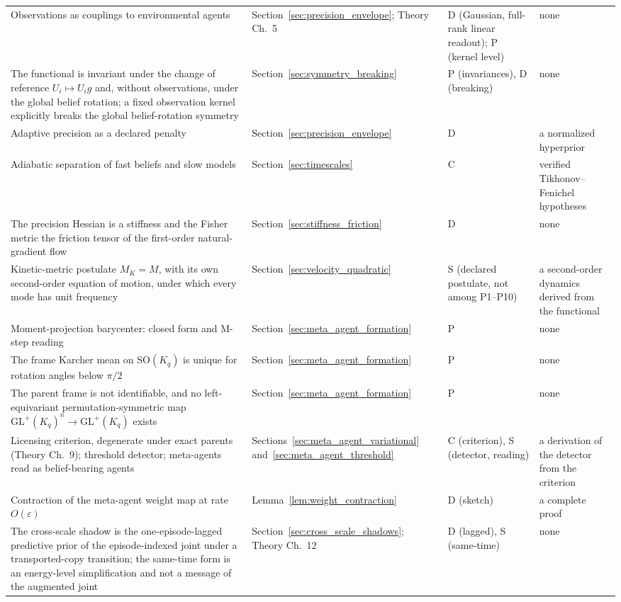\documentclass[11pt]{article}
\begin{document}
{\begin{longtable}{@{}>{\raggedright\arraybackslash}p{}>{\raggedright\arraybackslash}p{}>{\raggedright\arraybackslash}p{}>{\raggedright\arraybackslash}p{}@{}}
Observations as couplings to environmental agents & Section~\ref{sec:precision_envelope}; Theory Ch.~5 & D (Gaussian, full-rank linear readout); P (kernel level) & none \\
The functional is invariant under the change of reference $U_i\mapsto U_i g$ and, without observations, under the global belief rotation; a fixed observation kernel explicitly breaks the global belief-rotation symmetry & Section~\ref{sec:symmetry_breaking} & P (invariances), D (breaking) & none \\
Adaptive precision as a declared penalty & Section~\ref{sec:precision_envelope} & D & a normalized hyperprior \\
Adiabatic separation of fast beliefs and slow models & Section~\ref{sec:timescales} & C & verified Tikhonov--Fenichel hypotheses \\
The precision Hessian is a stiffness and the Fisher metric the friction tensor of the first-order natural-gradient flow & Section~\ref{sec:stiffness_friction} & D & none \\
Kinetic-metric postulate $M_K = M$, with its own second-order equation of motion, under which every mode has unit frequency & Section~\ref{sec:velocity_quadratic} & S (declared postulate, not among P1--P10) & a second-order dynamics derived from the functional \\
Moment-projection barycenter: closed form and M-step reading & Section~\ref{sec:meta_agent_formation} & P & none \\
The frame Karcher mean on $\mathrm{SO}(K_q)$ is unique for rotation angles below $\pi/2$ & Section~\ref{sec:meta_agent_formation} & P & none \\
The parent frame is not identifiable, and no left-equivariant permutation-symmetric map $\mathrm{GL}^+(K_q)^n\to\mathrm{GL}^+(K_q)$ exists & Section~\ref{sec:meta_agent_formation} & P & none \\
Licensing criterion, degenerate under exact parents (Theory Ch.~9); threshold detector; meta-agents read as belief-bearing agents & Sections~\ref{sec:meta_agent_variational} and~\ref{sec:meta_agent_threshold} & C (criterion), S (detector, reading) & a derivation of the detector from the criterion \\
Contraction of the meta-agent weight map at rate $O(\varepsilon)$ & Lemma~\ref{lem:weight_contraction} & D (sketch) & a complete proof \\
The cross-scale shadow is the one-episode-lagged predictive prior of the episode-indexed joint under a transported-copy transition; the same-time form is an energy-level simplification and not a message of the augmented joint & Section~\ref{sec:cross_scale_shadows}; Theory Ch.~12 & D (lagged), S (same-time) & none \\

\end{longtable}}
\end{document}
